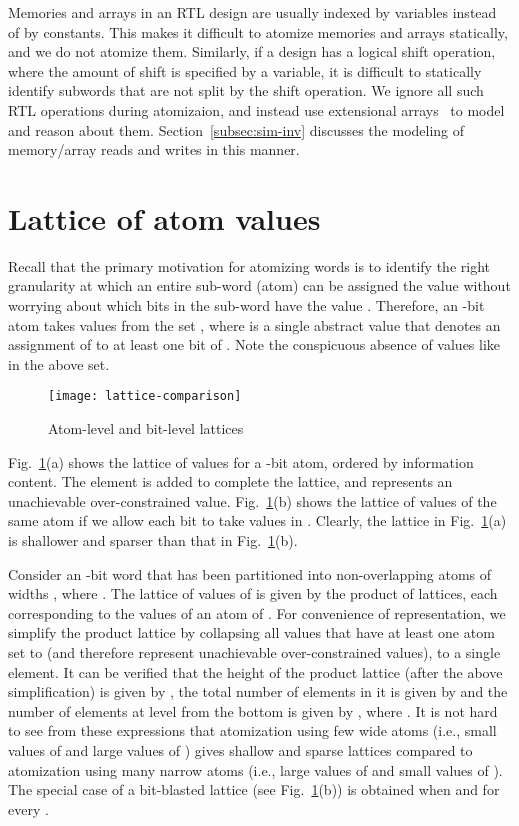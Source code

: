 \documentclass{llncs}
\begin{document}
Memories and arrays in an RTL design are usually indexed by variables
instead of by constants.  This makes it difficult to atomize memories
and arrays statically, and we do not atomize them.  Similarly, if a
design has a logical shift operation, where the amount of shift is
specified by a variable, it is difficult to statically identify
subwords that are not split by the shift operation.  We ignore all
such RTL operations during atomizaion, and instead use extensional
arrays~\cite{StumpBarrettDill01} to model and reason about them.
Section~\ref{subsec:sim-inv} discusses the modeling of
memory/array reads and writes in this manner.  


\section{Lattice of atom values}\label{sec:lattice}

Recall that the primary motivation for atomizing words is to identify
the right granularity at which an entire sub-word (atom) can be
assigned the value  without worrying about which bits in the
sub-word have the value .  Therefore, an -bit atom  takes
values from the set , where
 is a single abstract value that denotes an assignment of
 to at least one bit of .
Note the conspicuous absence of values like  in the above
set.
\begin{figure}[htbp]
\begin{center}
\hspace{-0.25in}\texttt{[image: lattice-comparison]}
\caption{\label{lattice-comparison} Atom-level and bit-level lattices}
\end{center}
\end{figure}
Fig.~\ref{lattice-comparison}(a) shows the lattice of values for a
-bit atom, ordered by information content.  The  element is
added to complete the lattice, and represents an unachievable
over-constrained value.  Fig.~\ref{lattice-comparison}(b) shows the
lattice of values of the same atom if we allow each bit to take values
in .  Clearly, the lattice in
Fig.~\ref{lattice-comparison}(a) is shallower and sparser than that
in Fig.~\ref{lattice-comparison}(b).

Consider an -bit word  that has been partitioned into
non-overlapping atoms of widths , where .  The lattice of values of  is given by the product of 
lattices, each corresponding to the values of an atom of .  For
convenience of representation, we simplify the product lattice by
collapsing all values that have at least one atom set to  (and
therefore represent unachievable over-constrained values), to a single
 element.
It can be verified that the height of the product lattice (after the
above simplification) is given by , the total number of elements
in it is given by  and the
number of elements at level  from the bottom is given by
, where .  It is not
hard to see from these expressions that atomization using few wide atoms (i.e.,
small values of  and large values of ) gives shallow and
sparse lattices compared to atomization using many narrow atoms (i.e.,
large values of  and small values of ).  The special case of a
bit-blasted lattice (see Fig.~\ref{lattice-comparison}(b)) is obtained
when  and  for every .
\end{document}
